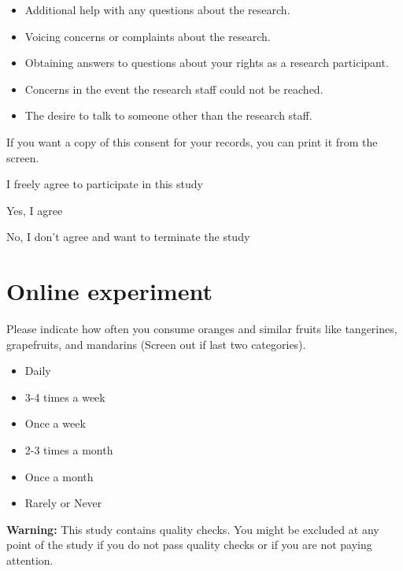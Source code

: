 \documentclass[12pt]{article}
\begin{document}
\begin{itemize}
    \item Additional help with any questions about the research.
    \item Voicing concerns or complaints about the research.
    \item Obtaining answers to questions about your rights as a research participant.
    \item Concerns in the event the research staff could not be reached.
    \item The desire to talk to someone other than the research staff.
\end{itemize} \par



If you want a copy of this consent for your records, you can print it from the screen. \par

I freely agree to participate in this study \par
[Dropdown menu options:] \par
Yes, I agree \par

No, I don't agree and want to terminate the study

\section{Online experiment}

 Please indicate how often you consume oranges and similar fruits like tangerines, grapefruits, and mandarins (Screen out if last two categories).  

\begin{itemize}
    \item Daily
    \item 3-4 times a week
    \item Once a week
    \item 2-3 times a month
    \item Once a month
    \item Rarely or Never
\end{itemize}

\vspace{1cm} %

\textbf{Warning:} This study contains quality checks. You might be excluded at any point of the study if you do not pass quality checks or if you are not paying attention.
\end{document}
